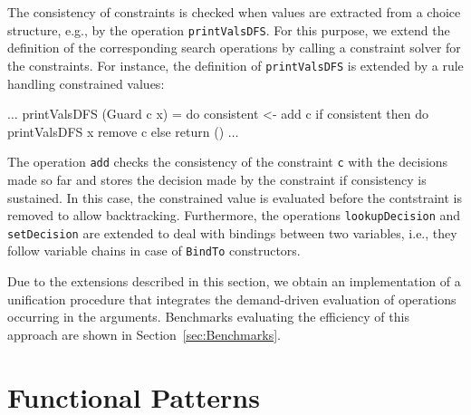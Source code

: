 \documentclass{llncs}
\newcommand{\code}[1]{\mbox{\small\texttt{#1}}}
\begin{document}
The consistency of constraints is checked when values are extracted
from a choice structure, e.g., by the operation \code{printValsDFS}.
For this purpose, we extend the definition of the corresponding search
operations by calling a constraint solver for the constraints.
For instance, the definition of \code{printValsDFS} is extended by
a rule handling constrained values:
%
\begin{haskell}
  $\ldots$
  printValsDFS (Guard c x) = do consistent <- add c
                                if consistent then do printValsDFS x
                                                      remove c
                                              else return ()
  $\ldots$
\end{haskell}
The operation \code{add} checks the consistency of the constraint \code{c}
with the decisions made so far and stores the decision made by the constraint
if consistency is sustained. In this case, the constrained value is evaluated
before the contstraint is removed to allow backtracking.
Furthermore, the operations \code{lookupDecision} and \code{setDecision}
are extended to deal with bindings between two variables,
i.e., they follow variable chains in case of \code{BindTo} constructors.

Due to the extensions described in this section,
we obtain an implementation of a unification procedure
that integrates the demand-driven evaluation of operations
occurring in the arguments.
Benchmarks evaluating the efficiency of this approach are
shown in Section~\ref{sec:Benchmarks}.


\section{Functional Patterns}
\label{sec:FuncPatterns}
\end{document}
